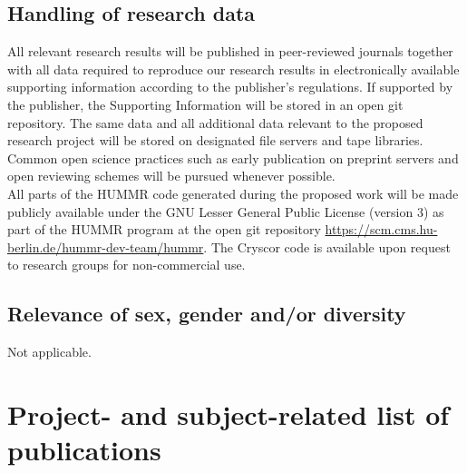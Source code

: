 \documentclass[a4paper,11pt,headings=normal]{scrartcl}
\newcommand{\bhl}{\color{blue}}
\newcommand{\ehl}{\color{black}}
\begin{document}
\begin{itemize}
\subsection{Handling of research data}
\vspace{-1em}
All relevant research results will be published in peer-reviewed journals 
together with all data required to reproduce our research results in 
electronically available supporting information according to the publisher's 
regulations. If supported by the publisher, the Supporting Information will be 
stored in an open git repository.
The same data and all additional data relevant to the proposed 
research project will be stored on designated file servers and tape libraries. 
Common open science practices such as early publication on preprint servers and open reviewing schemes will be pursued whenever possible.\\
All parts of the HUMMR code generated during the proposed work will be made 
publicly available under the GNU Lesser General Public License (version 3) as 
part of the HUMMR program at the open git repository 
\bhl \underline{https://scm.cms.hu-berlin.de/hummr-dev-team/hummr}\ehl. 
The Cryscor code is available upon request to research groups for 
non-commercial use.\\
\vspace{-2em}

\subsection{Relevance of sex, gender and/or diversity}
\vspace{-1em}
Not applicable.
\vspace{-1em}

\section{Project- and subject-related list of publications}
\vspace{-1em}
\setlength{}
\AtNextBibliography{\footnotesize}
\printbibliography[heading=none]
\newpage


\end{itemize}
\end{document}
